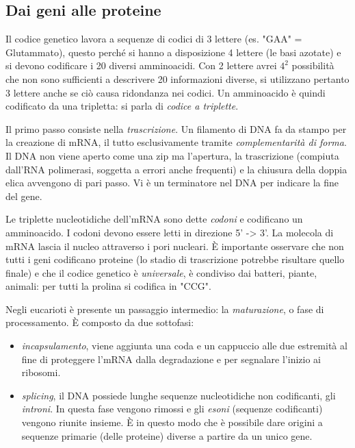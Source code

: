\subsection{Dai geni alle proteine}

Il codice genetico lavora a sequenze di codici di 3 lettere (es. "GAA" = Glutammato), questo perché si hanno a disposizione 4 lettere (le basi azotate) e si devono codificare i 20 diversi amminoacidi. Con 2 lettere avrei $4^{2}$ possibilità che non sono sufficienti a descrivere 20 informazioni diverse, si utilizzano pertanto 3 lettere anche se ciò causa ridondanza nei codici. Un amminoacido è quindi codificato da una tripletta: si parla di \textit{codice a triplette}. \\

\par Il primo passo consiste nella \textit{trascrizione}. Un filamento di DNA fa da stampo per la creazione di mRNA, il tutto esclusivamente tramite \textit{complementarità di forma}. Il DNA non viene aperto come una zip ma l'apertura, la trascrizione (compiuta dall'RNA polimerasi, soggetta a errori anche frequenti) e la chiusura della doppia elica avvengono di pari passo. Vi è un terminatore nel DNA per indicare la fine del gene. 

\par Le triplette nucleotidiche dell'mRNA sono dette \textit{codoni} e codificano un amminoacido. I codoni devono essere letti in direzione 5' -> 3'. La molecola di mRNA lascia il nucleo attraverso i pori nucleari. È importante osservare che non tutti i geni codificano proteine (lo stadio di trascrizione potrebbe risultare quello finale) e che il codice genetico è \textit{universale}, è condiviso dai batteri, piante, animali: per tutti la prolina si codifica in "CCG".

\par Negli eucarioti è presente un passaggio intermedio: la \textit{maturazione}, o fase di processamento. È composto da due sottofasi:
\begin{itemize}
	\item \textit{incapsulamento}, viene aggiunta una coda e un cappuccio alle due estremità al fine di proteggere l'mRNA dalla degradazione e per segnalare l'inizio ai ribosomi.
	\item \textit{splicing}, il DNA possiede lunghe sequenze nucleotidiche non codificanti, gli \textit{introni}. In questa fase vengono rimossi e gli \textit{esoni} (sequenze codificanti) vengono riunite insieme. È in questo modo che è possibile dare origini a sequenze primarie (delle proteine) diverse a partire da un unico gene.
\end{itemize}

